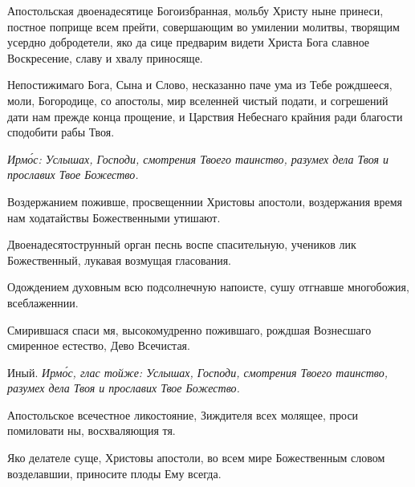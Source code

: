 
Апостольская двоенадесятице Богоизбранная, мольбу Христу ныне принеси, постное поприще всем прейти, совершающим во умилении молитвы, творящим усердно добродетели, яко да сице предварим видети Христа Бога славное Воскресение, славу и хвалу приносяще. 


Непостижимаго Бога, Сына и Слово, несказанно паче ума из Тебе рождшееся, моли, Богородице, со апостолы, мир вселенней чистый подати, и согрешений дати нам прежде конца прощение, и Царствия Небеснаго крайния ради благости сподобити рабы Твоя. 



\itshape Ирм\'{о}с\normalfont{}: Услышах, Господи, смотрения Твоего таинство, разумех дела Твоя и прославих Твое Божество.


Воздержанием поживше, просвещеннии Христовы апостоли, воздержания время нам ходатайствы Божественными утишают.


Двоенадесятострунный орган песнь воспе спасительную, учеников лик Божественный, лукавая возмущая гласования.


Одождением духовным всю подсолнечную напоисте, сушу отгнавше многобожия, всеблаженнии.


Смирившася спаси мя, высокомудренно пожившаго, рождшая Вознесшаго смиренное естество, Дево Всечистая.

Иный. \itshape Ирм\'{о}с\normalfont{}, глас тойже: Услышах, Господи, смотрения Твоего таинство, разумех дела Твоя и прославих Твое Божество.


Апостольское всечестное ликостояние, Зиждителя всех молящее, проси помиловати ны, восхваляющия тя.


Яко делателе суще, Христовы апостоли, во всем мире Божественным словом возделавшии, приносите плоды Ему всегда.

